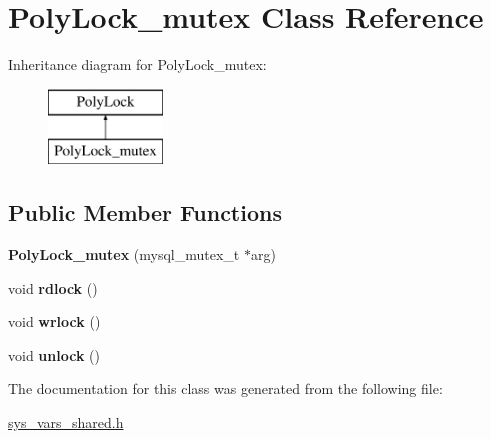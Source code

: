 \hypertarget{classPolyLock__mutex}{}\section{Poly\+Lock\+\_\+mutex Class Reference}
\label{classPolyLock__mutex}
Inheritance diagram for Poly\+Lock\+\_\+mutex\+:\begin{figure}[H]
\begin{center}
\leavevmode
\includegraphics[height=2.000000cm]{classPolyLock__mutex}
\end{center}
\end{figure}
\subsection*{Public Member Functions}
\begin{DoxyCompactItemize}
\item 
\mbox{\label{classPolyLock__mutex_a028b8b4d9c8fe22484b17a3066a1f9e1}} 
{\bfseries Poly\+Lock\+\_\+mutex} (mysql\+\_\+mutex\+\_\+t $\ast$arg)
\item 
\mbox{\label{classPolyLock__mutex_a02e8a179618caf055a08fae52a496e8f}} 
void {\bfseries rdlock} ()
\item 
\mbox{\label{classPolyLock__mutex_ac36e11898e19b463fefe5b7a744c0ba6}} 
void {\bfseries wrlock} ()
\item 
\mbox{\label{classPolyLock__mutex_af4e41c806eab62f130d528880c88d56b}} 
void {\bfseries unlock} ()
\end{DoxyCompactItemize}


The documentation for this class was generated from the following file\+:\begin{DoxyCompactItemize}
\item 
\mbox{\hyperlink{sys__vars__shared_8h}{sys\+\_\+vars\+\_\+shared.\+h}}\end{DoxyCompactItemize}
